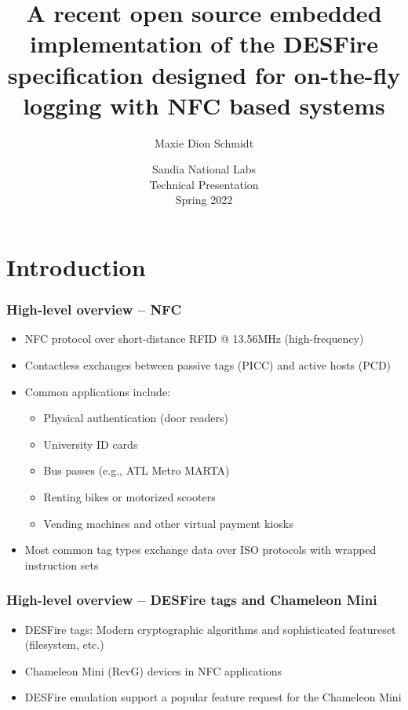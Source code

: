 \documentclass[usenames,svgnames,dvipsnames,11pt]{beamer}
\title[Sandia 2022 -- Embedded DESFire]{
     A recent open source embedded implementation of 
     the DESFire specification designed for on-the-fly logging with 
     NFC based systems
}
\author{Maxie Dion Schmidt} %
\institute[] 
{
\texttt{maxieds@gmail.com} \\ 
\url{http://people.math.gatech.edu/~mschmidt34} \\ 
\url{https://github.com/maxieds}
}
\date[Spring 2022]{Sandia National Labs \\ Technical Presentation \\ Spring 2022} %
\begin{document}
\begin{frame}
\titlepage %
\end{frame} 

\section{Introduction} 

\begin{frame}
\frametitle{High-level overview -- NFC}
\begin{itemize} 

\item NFC protocol over short-distance RFID @ 13.56MHz (high-frequency)
\item Contactless exchanges between passive tags (PICC) and active hosts (PCD)
\item Common applications include: 
      \begin{itemize}
      \item Physical authentication (door readers)
      \item University ID cards 
      \item Bus passes (e.g., ATL Metro MARTA)
      \item Renting bikes or motorized scooters 
      \item Vending machines and other virtual payment kiosks
      \end{itemize}
\item Most common tag types exchange data over ISO protocols with wrapped instruction sets

\end{itemize}

\end{frame}

\begin{frame}
\frametitle{High-level overview -- DESFire tags and Chameleon Mini}

\begin{itemize} 

\item DESFire tags: Modern cryptographic algorithms and sophisticated featureset (filesystem, etc.)
\item Chameleon Mini (RevG) devices in NFC applications 
\item DESFire emulation support a popular feature request for the Chameleon Mini

\end{itemize} 

\end{frame}
\end{document}
